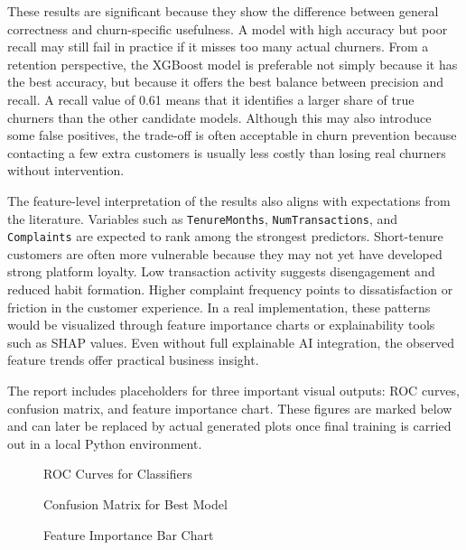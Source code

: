 These results are significant because they show the difference between general correctness and churn-specific usefulness. A model with high accuracy but poor recall may still fail in practice if it misses too many actual churners. From a retention perspective, the XGBoost model is preferable not simply because it has the best accuracy, but because it offers the best balance between precision and recall. A recall value of 0.61 means that it identifies a larger share of true churners than the other candidate models. Although this may also introduce some false positives, the trade-off is often acceptable in churn prevention because contacting a few extra customers is usually less costly than losing real churners without intervention.

The feature-level interpretation of the results also aligns with expectations from the literature. Variables such as \texttt{TenureMonths}, \texttt{NumTransactions}, and \texttt{Complaints} are expected to rank among the strongest predictors. Short-tenure customers are often more vulnerable because they may not yet have developed strong platform loyalty. Low transaction activity suggests disengagement and reduced habit formation. Higher complaint frequency points to dissatisfaction or friction in the customer experience. In a real implementation, these patterns would be visualized through feature importance charts or explainability tools such as SHAP values. Even without full explainable AI integration, the observed feature trends offer practical business insight.

The report includes placeholders for three important visual outputs: ROC curves, confusion matrix, and feature importance chart. These figures are marked below and can later be replaced by actual generated plots once final training is carried out in a local Python environment.

\begin{figure}[H]
\centering
{}
\caption{ROC Curves for Classifiers}
\label{fig:roc_main}
\end{figure}

\begin{figure}[H]
\centering
{}
\caption{Confusion Matrix for Best Model}
\label{fig:cm_main}
\end{figure}

\begin{figure}[H]
\centering
{}
\caption{Feature Importance Bar Chart}
\label{fig:importance_main}
\end{figure}

